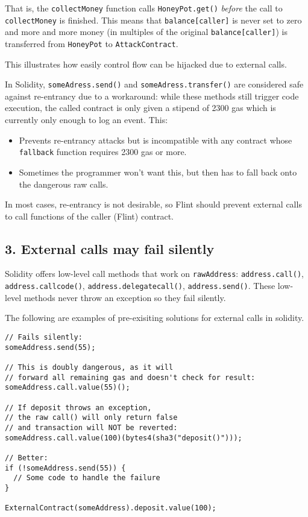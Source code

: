 That is, the \texttt{collectMoney} function calls \texttt{HoneyPot.get()} \textit{before} the call to \texttt{collectMoney} is finished. This means that \texttt{balance[caller]} is never set to zero and more and more money (in multiples of the original \texttt{balance[caller]}) is transferred from \texttt{HoneyPot} to \texttt{AttackContract}.

This illustrates how easily control flow can be hijacked due to external calls.

In Solidity, \texttt{someAdress.send()} and \texttt{someAdress.transfer()} are considered safe against re-entrancy due to a workaround: while these methods still trigger code execution, the called contract is only given a stipend of 2300 gas which is currently only enough to log an event. This:

\begin{itemize}
	\item Prevents re-entrancy attacks but is incompatible with any contract whose \texttt{fallback} function requires 2300 gas or more.
	\item Sometimes the programmer won't want this, but then has to fall back onto the dangerous raw calls.
\end{itemize}

In most cases, re-entrancy is not desirable, so Flint should prevent external calls to call functions of the caller (Flint) contract.

\subsection{3. External calls may fail silently}

Solidity offers low-level call methods that work on \texttt{rawAddress}: \texttt{address.call()}, \texttt{address.callcode()}, \texttt{address.delegatecall()}, \texttt{address.send()}. These low-level methods never throw an exception so they fail silently.

The following are examples of pre-exisiting solutions for external calls in solidity.

\begin{verbatim}
// Fails silently:
someAddress.send(55);

// This is doubly dangerous, as it will
// forward all remaining gas and doesn't check for result:
someAddress.call.value(55)();

// If deposit throws an exception,
// the raw call() will only return false
// and transaction will NOT be reverted:
someAddress.call.value(100)(bytes4(sha3("deposit()")));

// Better:
if (!someAddress.send(55)) {
  // Some code to handle the failure
}

ExternalContract(someAddress).deposit.value(100);
\end{verbatim}

